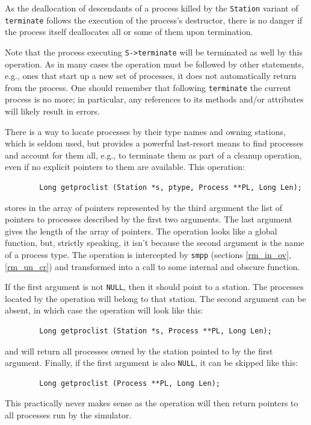 As the deallocation of descendants of a process killed by the {\tt Station}
variant of {\tt terminate} follows the execution of the process's
destructor, there is no danger if the process itself deallocates all or
some of them upon termination.

Note that the process executing {\tt S->terminate} will be terminated as well
by this operation.
As in many cases the operation must be followed by other statements, e.g.,
ones that
start up a new set of processes, it does not automatically return from the
process.
One should remember that following {\tt terminate} the current
process is no more;
in particular, any references to its methods and/or attributes will likely
result in errors.

There is a way to locate processes by their type names and owning stations,
which is seldom used, but provides a powerful last-resort means to find 
processes and account for them all, e.g., to terminate them as part of a
cleanup operation, even if no explicit pointers to them are available.
This operation:
\begin{verbatim}
        Long getproclist (Station *s, ptype, Process **PL, Long Len);
\end{verbatim}
\noindent
stores in the array of pointers represented by the third argument the list
of pointers to processes described by the first two arguments.
The last argument gives the length of the array of pointers.
The operation looks like a global function, but, strictly speaking, it isn't
because the second argument is the name of a process type.
The operation is intercepted by {\tt smpp}
(sections \ref{rm_in_ov}, \ref{rm_un_cr}) and transformed into a call to some
internal and obscure function.

If the first argument is not {\tt NULL}, then it should point to a station.
The processes located by the operation will belong to that station.
The second argument can be absent, in which case the operation will look like
this:
\begin{verbatim}
        Long getproclist (Station *s, Process **PL, Long Len);
\end{verbatim}
and will return all processes owned by the station pointed to by the first
argument.
Finally, if the first argument is also {\tt NULL}, it can be skipped like
this:
\begin{verbatim}
        Long getproclist (Process **PL, Long Len);
\end{verbatim}
This practically never makes sense as
the operation will then return pointers to all processes run by the
simulator.


